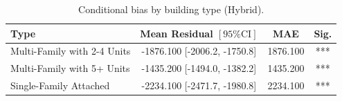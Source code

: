 \begin{table}[h!]
\centering
\caption{Conditional bias by building type (Hybrid).}
\label{tab:conditional_bias}
\begin{tabular}{@{}lccc@{}}
\toprule
\textbf{Type} & \textbf{Mean Residual} $\left[ \text{95\% CI} \right]$ & \textbf{MAE} & \textbf{Sig.} \\
\midrule
Multi-Family with 2-4 Units & -1876.100 [-2006.2, -1750.8] & 1876.100 & *** \\
Multi-Family with 5+ Units & -1435.200 [-1494.0, -1382.2] & 1435.200 & *** \\
Single-Family Attached & -2234.100 [-2471.7, -1980.8] & 2234.100 & *** \\
\bottomrule
\end{tabular}
\end{table}
